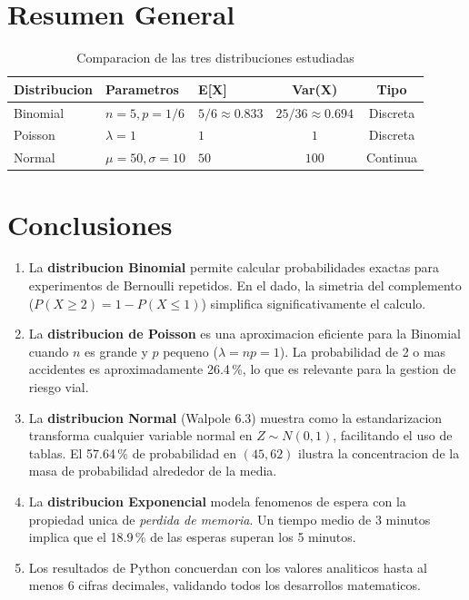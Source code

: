 \documentclass[12pt,a4paper]{article}
\begin{document}
\section{Resumen General}

\begin{table}[H]
\centering
\caption{Comparacion de las tres distribuciones estudiadas}
\renewcommand{\arraystretch}{1.5}
\begin{tabular}{lllcc}
\toprule
\textbf{Distribucion} & \textbf{Parametros} & \textbf{E[X]} & \textbf{Var(X)} & \textbf{Tipo} \\
\midrule
Binomial & $n=5, p=1/6$       & $5/6\approx0.833$  & $25/36\approx0.694$ & Discreta \\
Poisson  & $\lambda=1$        & $1$                & $1$                 & Discreta \\
Normal   & $\mu=50,\sigma=10$ & $50$               & $100$               & Continua \\
\bottomrule
\end{tabular}
\end{table}

\section{Conclusiones}

\begin{enumerate}
  \item La \textbf{distribucion Binomial} permite calcular probabilidades exactas para
        experimentos de Bernoulli repetidos. En el dado, la simetria del complemento
        ($P(X\geq2)=1-P(X\leq1)$) simplifica significativamente el calculo.

  \item La \textbf{distribucion de Poisson} es una aproximacion eficiente para la Binomial
        cuando $n$ es grande y $p$ pequeno ($\lambda = np = 1$). La probabilidad de
        2 o mas accidentes es aproximadamente 26.4\,\%, lo que es relevante para la
        gestion de riesgo vial.

  \item La \textbf{distribucion Normal} (Walpole 6.3) muestra como la estandarizacion
        transforma cualquier variable normal en $Z\sim N(0,1)$, facilitando el uso
        de tablas. El 57.64\,\% de probabilidad en $(45, 62)$ ilustra la concentracion
        de la masa de probabilidad alrededor de la media.

  \item La \textbf{distribucion Exponencial} modela fenomenos de espera con la propiedad
        unica de \emph{perdida de memoria}. Un tiempo medio de 3 minutos implica
        que el 18.9\,\% de las esperas superan los 5 minutos.

  \item Los resultados de Python concuerdan con los valores analiticos hasta al menos
        6 cifras decimales, validando todos los desarrollos matematicos.
\end{enumerate}
\end{document}
